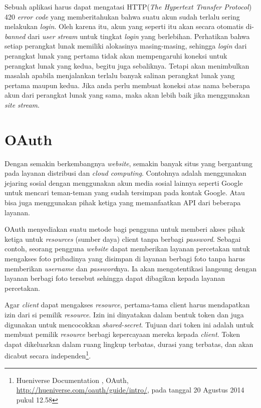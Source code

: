 Sebuah aplikasi harus dapat mengatasi HTTP(\textit{The Hypertext Transfer Protocol}) 420 \textit{error code} yang memberitahukan bahwa suatu akun sudah terlalu sering melakukan \textit{login}. Oleh karena itu, akun yang seperti itu akan secara otomatis di-\textit{banned} dari \textit{user stream} untuk tingkat \textit{login} yang berlebihan. Perhatikan bahwa setiap perangkat lunak memiliki alokasinya masing-masing, sehingga \textit{login} dari perangkat lunak yang pertama tidak akan mempengaruhi koneksi untuk perangkat lunak yang kedua, begitu juga sebaliknya. Tetapi akan menimbulkan masalah apabila menjalankan terlalu banyak salinan perangkat lunak yang pertama maupun kedua. Jika anda perlu membuat koneksi atas nama beberapa akun dari perangkat lunak yang sama, maka akan lebih baik jika menggunakan \textit{site stream}.

\section{OAuth}
\label{sec:oauth}
Dengan semakin berkembangnya \textit{website}, semakin banyak situs yang bergantung pada layanan distribusi dan \textit{cloud computing}. Contohnya adalah menggunakan jejaring sosial dengan menggunakan akun media sosial lainnya seperti Google untuk mencari teman-teman yang sudah tersimpan pada kontak Google. Atau bisa juga menggunakan pihak ketiga yang memanfaatkan API dari beberapa layanan.

OAuth menyediakan suatu metode bagi pengguna untuk memberi akses pihak ketiga untuk \textit{resources} (sumber daya) client tanpa berbagi \textit{password}. Sebagai contoh, seorang pengguna \textit{website} dapat memberikan layanan percetakan untuk mengakses foto pribadinya yang disimpan di layanan berbagi foto tanpa harus memberikan \textit{username} dan \textit{password}nya. Ia akan mengotentikasi langsung dengan layanan berbagi foto tersebut sehingga dapat dibagikan kepada layanan percetakan.

Agar \textit{client} dapat mengakses \textit{resource}, pertama-tama client harus mendapatkan izin dari si pemilik \textit{resource}. Izin ini dinyatakan dalam bentuk token dan juga digunakan untuk mencocokkan \textit{shared-secret}. Tujuan dari token ini adalah untuk membuat pemilik \textit{resource} berbagi kepercayaan mereka kepada \textit{client}. Token dapat dikeluarkan dalam ruang lingkup terbatas, durasi yang terbatas, dan akan dicabut secara independen\footnote{Hueniverse Documentation , OAuth, \url{http://hueniverse.com/oauth/guide/intro/}, pada tanggal 20 Agustus 2014 pukul 12.58}.

